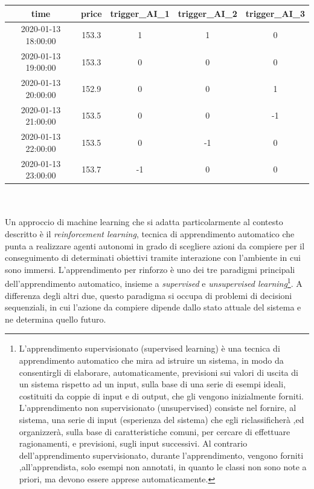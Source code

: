 \documentclass[a4paper,12pt]{report}
\begin{document}
\begin{fig}
\begin{fig}
	\begin{center}
	\begin{tabular}{||c c c c c ||} 
		\hline
		time & price & trigger\_AI\_1 & trigger\_AI\_2 & trigger\_AI\_3 \\ [0.5ex] 
		\hline\hline
		2020-01-13 18:00:00 & 153.3 & 1 & 1 & 0\\
		\hline
		2020-01-13 19:00:00 & 153.3 & 0 & 0 & 0\\
		\hline
		2020-01-13 20:00:00 & 152.9 & 0 & 0 & 1\\
		\hline
		2020-01-13 21:00:00 & 153.5 & 0 & 0 & -1\\
		\hline
		2020-01-13 22:00:00 & 153.5 & 0 & -1 & 0\\
		\hline
		2020-01-13 23:00:00 & 153.7 & -1 & 0 & 0\\ [1ex] 
		\hline
	\end{tabular}
	\end{center}
	\label{Tabella 3}
\end{fig}
\\~\\Un approccio di machine learning che si adatta particolarmente al contesto descritto è il \textit{reinforcement learning}, tecnica di apprendimento automatico che punta a realizzare agenti autonomi in grado di scegliere azioni da compiere per il conseguimento di determinati obiettivi tramite interazione con l'ambiente in cui sono immersi.
L'apprendimento per rinforzo \cite{rl} è uno dei tre paradigmi principali dell'apprendimento automatico, insieme a \textit{supervised} e \textit{unsupervised learning}\footnote{L'apprendimento supervisionato (supervised learning) è una tecnica di apprendimento automatico che mira ad istruire un sistema, in modo da consentirgli di elaborare, automaticamente, previsioni sui valori di uscita di un sistema rispetto ad un input, sulla base di una serie di esempi ideali, costituiti da coppie di input e di output, che gli vengono inizialmente forniti.\\ L'apprendimento non supervisionato (unsupervised) consiste nel fornire, al sistema, una serie di input (esperienza del sistema) che egli riclassificherà ,ed organizzerà, sulla base di caratteristiche comuni, per cercare di effettuare ragionamenti, e previsioni, sugli input successivi. Al contrario dell'apprendimento supervisionato, durante l'apprendimento, vengono forniti ,all'apprendista, solo esempi non annotati, in quanto le classi non sono note a priori, ma devono essere apprese automaticamente. }. A differenza degli altri due, questo paradigma si occupa di problemi di decisioni sequenziali, in cui l'azione da compiere dipende dallo stato attuale del sistema e ne determina quello futuro.\\

\end{fig}
\end{document}

